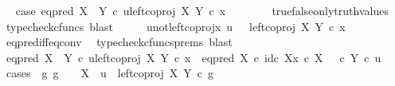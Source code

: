 \begin{isabellebody}
\ \isamarkupfalse%
\ case{}{\isacharcolon}{\kern0pt}\ {\isachardoublequoteopen}eq{\isacharunderscore}{\kern0pt}pred\ {\isacharparenleft}{\kern0pt}X\ {\isasymCoprod}\ Y{\isacharparenright}{\kern0pt}\ {\isasymcirc}\isactrlsub c\ {\isasymlangle}u{\isacharcomma}{\kern0pt}left{\isacharunderscore}{\kern0pt}coproj\ X\ Y\ {\isasymcirc}\isactrlsub c\ x{\isasymrangle}\ {\isacharequal}{\kern0pt}\ {\isasymf}{\isachardoublequoteclose}\isanewline
\ \ \ \ \isamarkupfalse%
\ true{\isacharunderscore}{\kern0pt}false{\isacharunderscore}{\kern0pt}only{\isacharunderscore}{\kern0pt}truth{\isacharunderscore}{\kern0pt}values\ \isamarkupfalse%
\ {\isacharparenleft}{\kern0pt}typecheck{\isacharunderscore}{\kern0pt}cfuncs{\isacharcomma}{\kern0pt}\ blast{\isacharparenright}{\kern0pt}\isanewline
\ \ \isamarkupfalse%
\ \isamarkupfalse%
\ u{\isacharunderscore}{\kern0pt}not{\isacharunderscore}{\kern0pt}left{\isacharunderscore}{\kern0pt}coproj{\isacharunderscore}{\kern0pt}x{\isacharcolon}{\kern0pt}\ {\isachardoublequoteopen}u\ \ {\isasymnoteq}\ left{\isacharunderscore}{\kern0pt}coproj\ X\ Y\ {\isasymcirc}\isactrlsub c\ x{\isachardoublequoteclose}\isanewline
\ \ \ \ \isamarkupfalse%
\ eq{\isacharunderscore}{\kern0pt}pred{\isacharunderscore}{\kern0pt}iff{\isacharunderscore}{\kern0pt}eq{\isacharunderscore}{\kern0pt}conv\ \isamarkupfalse%
\ {\isacharparenleft}{\kern0pt}typecheck{\isacharunderscore}{\kern0pt}cfuncs{\isacharunderscore}{\kern0pt}prems{\isacharcomma}{\kern0pt}\ blast{\isacharparenright}{\kern0pt}\isanewline
\ \ \isamarkupfalse%
\ {\isachardoublequoteopen}eq{\isacharunderscore}{\kern0pt}pred\ {\isacharparenleft}{\kern0pt}X\ {\isasymCoprod}\ Y{\isacharparenright}{\kern0pt}\ {\isasymcirc}\isactrlsub c\ {\isasymlangle}u{\isacharcomma}{\kern0pt}left{\isacharunderscore}{\kern0pt}coproj\ X\ Y\ {\isasymcirc}\isactrlsub c\ x{\isasymrangle}\ {\isacharequal}{\kern0pt}\ {\isacharparenleft}{\kern0pt}eq{\isacharunderscore}{\kern0pt}pred\ X\ {\isasymcirc}\isactrlsub c\ {\isasymlangle}id\isactrlsub c\ X{\isacharcomma}{\kern0pt}x\ {\isasymcirc}\isactrlsub c\ {\isasymbeta}\isactrlbsub X\isactrlesub {\isasymrangle}{\isacharparenright}{\kern0pt}\ {\isasymamalg}\ {\isacharparenleft}{\kern0pt}{\isasymf}\ {\isasymcirc}\isactrlsub c\ {\isasymbeta}\isactrlbsub Y\isactrlesub {\isacharparenright}{\kern0pt}\ {\isasymcirc}\isactrlsub c\ u{\isachardoublequoteclose}\isanewline
\ \ \isamarkupfalse%
\ {\isacharparenleft}{\kern0pt}cases\ {\isachardoublequoteopen}{\isasymexists}\ g{\isachardot}{\kern0pt}\ g\ {\isacharcolon}{\kern0pt}\ {\isasymone}\ {\isasymrightarrow}\ X\ {\isasymand}\ u\ {\isacharequal}{\kern0pt}\ left{\isacharunderscore}{\kern0pt}coproj\ X\ Y\ {\isasymcirc}\isactrlsub c\ g{\isachardoublequoteclose}{\isacharparenright}{\kern0pt}\ \ \isanewline

\end{isabellebody}

